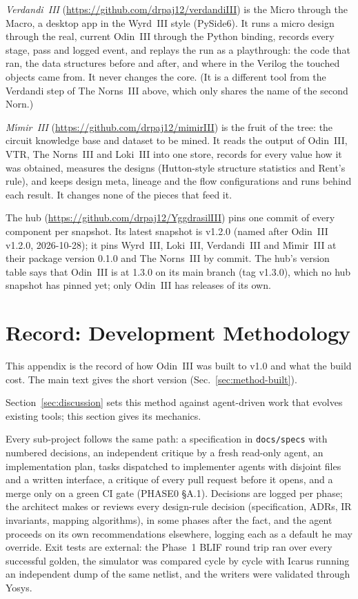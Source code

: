 \documentclass[conference]{IEEEtran}
\newcommand{\code}[1]{\texttt{#1}}
\begin{document}
\emph{Verdandi~III} (\url{https://github.com/drpaj12/verdandiIII}) is the Micro through the Macro,
a desktop app in the Wyrd~III style (PySide6). It runs a micro design through the real, current
Odin~III through the Python binding, records every stage, pass and logged event, and replays the run
as a playthrough: the code that ran, the data structures before and after, and where in the Verilog
the touched objects came from. It never changes the core. (It is a different tool from the
Verdandi step of The Norns~III above, which only shares the name of the second Norn.)

\emph{M\'{\i}mir~III} (\url{https://github.com/drpaj12/mimirIII}) is the fruit of the tree: the
circuit knowledge base and dataset to be mined. It reads the output of Odin~III, VTR, The Norns~III
and Loki~III into one store, records for every value how it was obtained, measures the designs
(Hutton-style structure statistics and Rent's rule), and keeps design meta, lineage and the flow
configurations and runs behind each result. It changes none of the pieces that feed it.

The hub (\url{https://github.com/drpaj12/YggdrasilIII}) pins one commit of every component per
snapshot. Its latest snapshot is v1.2.0 (named after Odin~III v1.2.0, 2026-10-28); it pins Wyrd~III, Loki~III, Verdandi~III and
M\'{\i}mir~III at their package version 0.1.0 and The Norns~III by commit. The hub's version table says that Odin~III is at 1.3.0
on its main branch (tag v1.3.0), which no hub snapshot has pinned yet; only Odin~III has releases of its own.
\appendices
\section{Record: Development Methodology}
\label{sec:appmethod}

This appendix is the record of how Odin~III was built to v1.0 and what the build cost. The main
text gives the short version (Sec.~\ref{sec:method-built}).

\label{sec:method}

Section~\ref{sec:discussion} sets this method against agent-driven work that evolves existing
tools; this section gives its mechanics.

Every sub-project follows the same path: a specification in \code{docs/specs} with numbered
decisions, an independent critique by a fresh read-only agent, an implementation plan, tasks
dispatched to implementer agents with disjoint files and a written interface, a critique of every
pull request before it opens, and a merge only on a green CI gate (PHASE0 \S A.1). Decisions are
logged per phase; the architect makes or reviews every design-rule decision (specification, ADRs,
IR invariants, mapping algorithms), in some phases after the fact, and the agent proceeds on its
own recommendations elsewhere, logging each as a default he may override. Exit tests are external: the Phase~1 BLIF round trip
ran over every successful golden, the simulator was compared cycle by cycle with Icarus running
an independent dump of the same netlist, and the writers were validated through Yosys.
\end{document}
